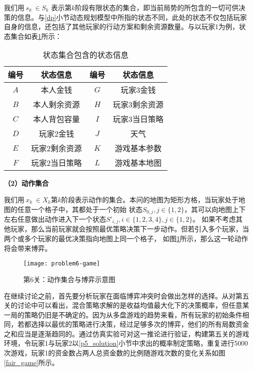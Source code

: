 \documentclass[bwprint]{cumcmthesis} %
\begin{document}
我们用$ \ s_k\ \in S_k $ 表示第$k$阶段有限状态的集合，即当前局势的所包含的一切可供决策的信息。与\ref{dp}小节动态规划模型中所指的状态不同，此处的状态不仅包括玩家自身的信息，还包括了其他玩家的行动方案和剩余资源数量。与以玩家1为例，状态集合如表\ref{tab:MDPS_states}所示：
\begin{table}[!htbp]
    \caption{状态集合包含的状态信息}\label{tab:MDPS_states} \centering
    \begin{tabular}{cc|cc}
        \toprule[1.5pt]
        编号  & 状态信息 & 编号 & 状态信息\\
        \midrule[1pt]
        $A$ & 本人金钱     & $G$ & 玩家3金钱 \\
        $B$ & 本人剩余资源  & $H$ & 玩家3剩余资源\\
        $C$ & 本人背包容量  & $I$ & 玩家3当日策略 \\
        $D$ & 玩家2金钱    & $J$ & 天气 \\
        $E$ & 玩家2剩余资源 & $K$ & 游戏基本参数 \\
        $F$ & 玩家2当日策略 & $L$ & 游戏基本地图 \\
        \bottomrule[1.5pt]
    \end{tabular}
\end{table}

\textbf{（2）动作集合}

我们用$ \ x_k\ \in X_k $第$k$阶段表示动作的集合。本问的地图为矩形方格，当玩家处于地图的任意一个格子中，其都处于一个初始
状态$S_{0,j} ,j\in \{ 1,2 \}$，其可以向地图上下左右任意做出动作进入下一个状态$ S'_{i,j},i\in \{1,2,3,4\} ,j\in \{ 1,2 \} $。
如果不考虑其他玩家，那么当前玩家就会按照最优策略决策下一步动作。但若引入多个玩家，当两个或多个玩家的最优决策指向地图上同一个格子，
如图\ref{fig:problem6-game}所示，那么这一轮动作将会带来博弈。

\begin{figure}[!h]
    \centering
    \texttt{[image: problem6-game]}
    \caption{第6关：动作集合与博弈示意图}
    \label{fig:problem6-game}
\end{figure}

在继续讨论之前，首先要分析玩家在面临博弈冲突时会做出怎样的选择。从对第五关的讨论中可以看出，混合策略求解的是收益均值最大化下的决策概率，但任意某一局的策略仍旧是不确定的。因为从多盘游戏的趋势来看，所有玩家的初始条件相同，若都选择以最优的策略进行决策，经过足够多次的博弈，他们的所有局数资金之和应当是逐渐趋同的。通过仿真实验可对这一推论进行验证，构建第五关的游戏环境，令玩家1与玩家2以\ref{p5_solution}小节中求出的概率制定策略，重复进行5000次游戏，玩家1的资金数占两人总资金数的比例随游戏次数的变化关系如图\ref{fair_game}所示。
\end{document}
